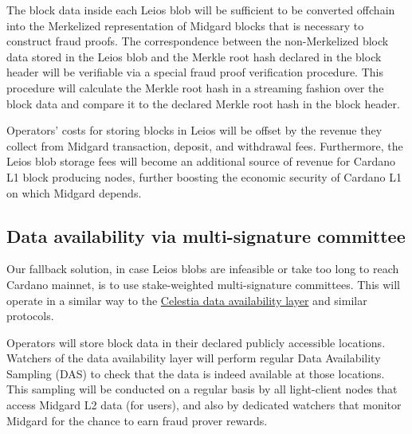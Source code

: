 \documentclass[../midgard.tex]{subfiles}
\begin{document}
The block data inside each Leios blob will be sufficient to be converted offchain into the Merkelized representation of Midgard blocks that is necessary to construct fraud proofs.
The correspondence between the non-Merkelized block data stored in the Leios blob and the Merkle root hash declared in the block header will be verifiable via a special fraud proof verification procedure.
This procedure will calculate the Merkle root hash in a streaming fashion over the block data and compare it to the declared Merkle root hash in the block header.


Operators' costs for storing blocks in Leios will be offset by the revenue they collect from Midgard transaction, deposit, and withdrawal fees.
Furthermore, the Leios blob storage fees will become an additional source of revenue for Cardano L1 block producing nodes, further boosting the economic security of Cardano L1 on which Midgard depends.

\subsection{Data availability via multi-signature committee}
\label{h:data-availability-multisig}

Our fallback solution, in case Leios blobs are infeasible or take too long to reach Cardano mainnet, is to use stake-weighted multi-signature committees.
This will operate in a similar way to the \href{https://docs.celestia.org/learn/how-celestia-works/data-availability-layer}{Celestia data availability layer}
and similar protocols.

Operators will store block data in their declared publicly accessible locations.
Watchers of the data availability layer will perform regular Data Availability Sampling (DAS) to check that the data is indeed available at those locations.
This sampling will be conducted on a regular basis by all light-client nodes that access Midgard L2 data (for users), and also by dedicated watchers that monitor Midgard for the chance to earn fraud prover rewards.
\end{document}
